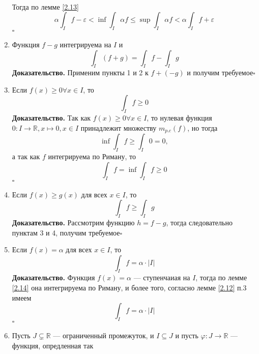 \documentclass[a4paper]{article}
\newcommand{\qed}{\hfill$\square$}
\begin{document}
\begin{enumerate}
$$\begin{aligned}
    \end{aligned}$$
    Тогда по лемме \ref{2.13}
    \begin{equation*}
        \alpha\int_I f-\varepsilon<\inf\int_I\alpha f\leqslant\sup\int_I\alpha f<\alpha\int_I f+\varepsilon
    \end{equation*}\qed
    \item Функция $f-g$ интегрируема на $I$ и 
    \begin{equation*}
        \int_I(f+g)=\int_I f-\int_I g
    \end{equation*}
    \textbf{Доказательство.} Применим пункты 1 и 2 к $f+(-g)$ и получим требуемое\qed
    \item Если $f(x)\geqslant0\forall x\in I$, то
    \begin{equation*}
        \int_I f\geqslant0
    \end{equation*}
    \textbf{Доказательство.} Так как $f(x)\geqslant0\forall x\in I$, то нулевая функция $0:I\rightarrow\mathbb{R},x\longmapsto0,x\in I$ принадлежит множеству $m_{p.c}(f)$, но тогда
    \begin{equation*}
        \inf\int_I f\geqslant\int_I 0=0,
    \end{equation*}
    а так как $f$ интегрируема по Риману, то
    \begin{equation*}
        \int_I f=\inf\int_I f\geqslant0
    \end{equation*}\qed
    \item Если $f(x)\geqslant g(x)$ для всех $x\in I$, то
    \begin{equation*}
        \int_I f\geqslant\int_I g
    \end{equation*}
    \textbf{Доказательство.} Рассмотрим функцию $h=f-g$, тогда следовательно пунктам 3 и 4, получим требуемое\qed
    \item Если $f(x)=\alpha$ для всех $x\in I$, то
    \begin{equation*}
        \int_I f=\alpha\cdot|I|
    \end{equation*}
    \textbf{Доказательство.} Функция $f(x)=\alpha$ — ступенчаиая на $I$, тогда по лемме \ref{2.14} она интегрируема по Риману, и более того, согласно лемме \ref{2.12} п.3 имеем
    \begin{equation*}
        \int_I f=\alpha\cdot|I|
    \end{equation*}\qed
    \item Пусть $J\subsetneq\mathbb{R}$ — ограниченный промежуток, и $I\subseteq J$ и пусть $\varphi:J\rightarrow\mathbb{R}$ — функция, опредленная так
    \begin{equation*}

\end{equation*}
\end{enumerate}
\end{document}
